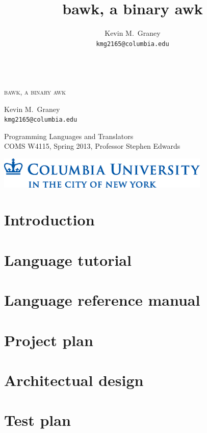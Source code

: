 \documentclass[letterpaper,11pt]{report}
\title{bawk, a binary awk}
\author{
	Kevin M.\ Graney\\
	\texttt{kmg2165@columbia.edu}
}
\begin{document}
\begin{titlepage}
\begin{center}
~\\\vspace{1.75in}
\Huge
\textsc{bawk, a binary awk}

\vspace{1in}
\LARGE
Kevin M.\ Graney\\
\texttt{kmg2165@columbia.edu}

\Large
\vspace{1.75in}
Programming Languages and Translators\\
COMS W4115, Spring 2013, Professor Stephen Edwards

\end{center}
\vfill
\includegraphics[width=4in]{columbia_university.eps}
\end{titlepage}
\tableofcontents
\lstlistoflistings

\chapter{Introduction}


\chapter{Language tutorial}
\chapter{Language reference manual}


\chapter{Project plan}


\chapter{Architectual design}


\chapter{Test plan}

\end{document}
